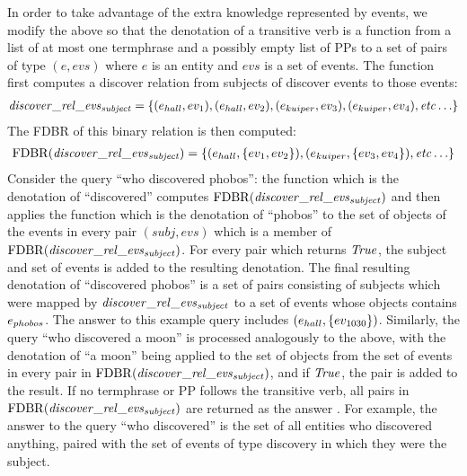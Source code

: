 \documentclass[../main.tex]{subfiles}
\begin{document}
\begin{refsection}
In order to take advantage of the extra knowledge represented by events, we modify the above so
that the denotation of a transitive verb is a function from a list of at most one termphrase and a possibly empty list of PPs to a set of pairs of type $(e,\mathit{evs})$ where $e$ is an entity and $\mathit{evs}$ is a set of events.
The function first computes a discover relation from subjects of discover events to those events:
\begin{multline*}
	\mathit{discover\_rel}\_\mathit{evs}_\mathit{subject} = \{ (e_{hall}, ev_{\mathrm{1}}), (e_{hall}, ev_{\mathrm{2}}), (e_{kuiper}, ev_{\mathrm{3}}), (e_{kuiper}, ev_{\mathrm{4}}), \mathit{etc} \ldots \}
\end{multline*}
The FDBR of this binary relation is then computed:
\begin{multline*}
	\mathrm{FDBR}({\mathit{discover\_rel}\_\mathit{evs}_{\mathit{subject}}}) = \{(e_{hall}, \{ev_{\mathrm{1}}, ev_{\mathrm{2}}\}), (e_{kuiper}, \{ev_{\mathrm{3}}, ev_{\mathrm{4}}\}), \mathit{etc} \ldots \}
\end{multline*}
Consider the query ``who discovered phobos'': the function which is the denotation
of ``discovered'' computes $\mathrm{FDBR}({\mathit{discover\_rel}\_\mathit{evs}_{\mathit{subject}}})$ and then applies the function which is the
denotation of ``phobos'' to the set of objects of the events in every pair $(\mathit{subj},\mathit{evs})$ which is a
member of $\mathrm{FDBR}({\mathit{discover\_rel}\_\mathit{evs}_{\mathit{subject}}})$. For every pair which returns $\mathit{True}$, the subject and set of events is
added to the resulting denotation. The final resulting denotation of
``discovered phobos'' is a set of pairs consisting of subjects which were mapped by
$\mathit{discover\_rel}\_\mathit{evs}_{\mathit{subject}}$ to a set of events whose objects contains $e_{phobos}$. The answer to this example query includes $(e_{hall}, \{ev_{\mathrm{1030}}\})$. Similarly, the query ``who
discovered a moon'' is processed analogously to the above, with the denotation of ``a moon''
being applied to the set of objects from the set of events in every pair in $\mathrm{FDBR}({\mathit{discover\_rel}\_\mathit{evs}_{\mathit{subject}}})$,
and if $\mathit{True}$, the pair is added to the result.
If no termphrase or PP follows the transitive verb, all pairs in $\mathrm{FDBR}({\mathit{discover\_rel}\_\mathit{evs}_{\mathit{subject}}})$
are returned as the answer . For example, the answer to the query ``who discovered'' is the set of
all entities who discovered anything, paired with the set of events of type discovery in which
they were the subject.


\end{refsection}
\end{document}
